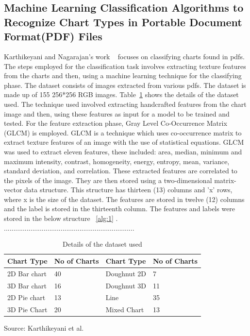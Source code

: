 \documentclass[12pt, a4paper,oneside]{report}
\newcommand{\source}[1]{\vspace{-3pt} \caption*{ Source: {#1}} }
\begin{document}
\subsection{Machine Learning Classification Algorithms to Recognize Chart Types in Portable Document Format(PDF) Files}
Karthikeyani and Nagarajan's work ~\cite{karthikeyani2012machine} focuses on classifying charts found in pdfs. The steps employed for the classification task involves extracting texture features from the charts and then, using a machine learning technique for the classifying phase. The dataset consists of images extracted from various pdfs. The dataset is made up of 155 256*256 RGB images. Table~\ref{table:pdf} shows the details of the dataset used.
The technique used involved extracting handcrafted features from the chart image and then, using these features as input for a model to be trained and tested. For the feature extraction phase, Gray Level Co-Occurrence Matrix (GLCM) is employed. GLCM is a technique which uses co-occurrence matrix to extract texture features of an image with the use of statistical equations. GLCM was used to extract eleven features, these included: area, median, minimum and maximum intensity, contrast, homogeneity, energy, entropy, mean, variance, standard deviation, and correlation. These extracted features are correlated to the pixels of the image. They are then stored using a two-dimensional matrix-vector data structure. This structure has thirteen (13) columns and 'x' rows, where x is the size of the dataset. The features are stored in twelve (12) columns and the label is stored in the thirteenth column. The features and labels were stored in the below structure ~\ref{alg:1} .
.....................................................................
\begin{table}[h]
	\centering {} \small
	\begin{tabular}{|p{3cm}|p{3cm}|p{3cm}|p{3cm}|}
		\hline
		Chart Type & No of Charts & Chart
		Type & No of Charts  \\ \hline
		2D Bar chart & 40 & Doughnut 2D & 7 \\ \hline
		3D Bar chart & 16 & Doughnut 3D & 11\\ \hline
		2D Pie chart & 13 & Line & 35 \\ \hline
		3D Pie Chart & 20 & Mixed Chart& 13 \\ \hline
	\end{tabular}
	\caption {Details of the dataset used}	
	\label{table:pdf}
	\source{Karthikeyani et al.~\cite{karthikeyani2012machine}}
\end{table}
\end{document}
